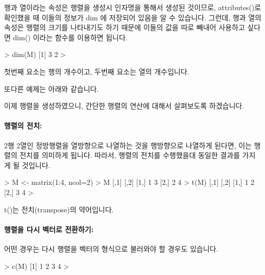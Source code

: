 행과 열이라는 속성은 행렬을 생성시 인자명을 통해서 생성된 것이므로, attributes()로 확인했을 때 이들의 정보가 dim 에 저장되어 있음을 알 수 있습니다. 
그런데, 행과 열의 속성은 행렬의 크기를 나타내기도 하기 때문에 이들의 값을 따로 빼내어 사용하고 싶다면 dim() 이라는 함수를 이용하면 됩니다. 

\begin{Schunk}
\begin{Soutput}
> dim(M)
[1] 3 2
>
\end{Soutput}
\end{Schunk}

첫번째 요소는 행의 개수이고, 두번째 요소는 열의 개수입니다. 

또다른 예제는 아래와 같습니다. 

\begin{Schunk}
\end{Schunk}

이제 행렬을 생성하였으니, 간단한 행렬의 연산에 대해서 살펴보도록 하겠습니다. 

\paragraph{행렬의 전치: }
2행 2열인 정방행렬을 열방향으로 나열하는 것을 행방향으로 나열하게 된다면, 이는 행렬의 전치를 의미하게 됩니다. 
따라서, 행렬의 전치를 수행했을대 동일한 결과를 가지게 될 것입니다. 

\begin{Schunk}
\begin{Soutput}
> M <- matrix(1:4, ncol=2)
> M
     [,1] [,2]
[1,]    1    3
[2,]    2    4
> t(M)
     [,1] [,2]
[1,]    1    2
[2,]    3    4
> 
\end{Soutput}
\end{Schunk}

t()는 전치(transpose)의 약어입니다.

\paragraph{행렬을 다시 벡터로 전환하기:}
어떤 경우는 다시 행렬을 벡터의 형식으로 불러와야 할 경우도 있습니다. 

\begin{Schunk}
\begin{Soutput}
> c(M)
[1] 1 2 3 4
> 
\end{Soutput}
\end{Schunk}


